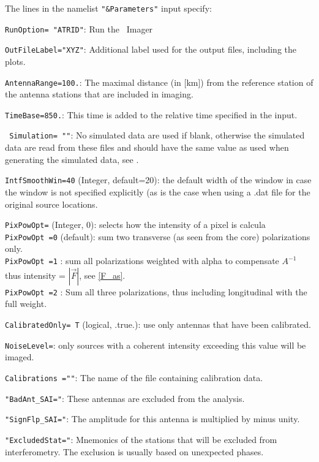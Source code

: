The lines in the namelist \verb!"&Parameters"! input specify:
\begin{enumerate*}
\item \verb!RunOption= "ATRID"!: Run the \ATRID\ Imager
\item \verb!OutFileLabel="XYZ"!: Additional label used for the output files, including the plots.
\item \verb!AntennaRange=100.!: The maximal distance (in [km]) from the reference station of the antenna stations that are included in imaging.
\item \verb!TimeBase=850.!: This time is added to the relative time specified in the input.
\item \verb# Simulation= ""#: No simulated data are used if blank, otherwise the simulated data are read from these files and should have the same value as used when generating the simulated data, see .
\item \verb!IntfSmoothWin=40! (Integer, default=20): the default width of the window in case the window is not specified explicitly (as is the case when using a .dat file for the original source locations.
\item \verb!PixPowOpt=! (Integer, 0): selects how the intensity of a pixel is calcula
   \\\verb!PixPowOpt =0! (default): sum two transverse (as seen from the core) polarizations only.
   \\\verb!PixPowOpt =1! : sum all polarizations weighted with alpha to compensate $A^{-1}$ thus intensity =  $|\vec{F}|$, see \eqref{F_as}.
   \\\verb!PixPowOpt =2! : Sum all three polarizations, thus including longitudinal with the full weight.
\item \verb!CalibratedOnly= T! (logical, .true.): use only antennas that have been calibrated.
\item \verb!NoiseLevel=!: only sources with a coherent intensity exceeding this value will be imaged.
\item \verb!Calibrations =""!: The name of the file containing calibration data.
\item \verb!"BadAnt_SAI="!: These antennas are excluded from the analysis.
\item \verb!"SignFlp_SAI="!: The amplitude for this antenna is multiplied by minus unity.
\item \verb!"ExcludedStat="!: Mnemonics of the stations that will be excluded from interferometry. The exclusion is usually based on unexpected phases.
\end{enumerate*}


